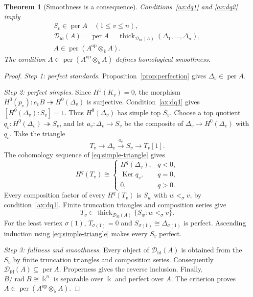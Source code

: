\documentclass[11pt,a4paper]{article}
\newcommand{\defn}[1]{\textsl{\color{darkblue} #1}}
\newcommand{\D}{\mathcal D}
\newcommand{\op}{\mathrm{op}}
\newcommand{\std}{\Delta}
\newcommand{\Ker}{\operatorname{Ker}}
\DeclareMathOperator{\fd}{fd}
\DeclareMathOperator{\thick}{thick}
\DeclareMathOperator{\per}{per}
\DeclareMathOperator{\rad}{rad}
\theoremstyle{plain}
\newtheorem{theorem}{Theorem}[section]
\theoremstyle{definition}
\numberwithin{equation}{section}
\begin{document}
\begin{theorem}[Smoothness is a consequence]\label{thm:smoothness}
Conditions~\ref{ax:dq1} and \ref{ax:dq2} imply
\begin{equation}\label{eq:smoothness}
 \begin{gathered}
 S_v\in\per A\quad(1\leq v\leq n),\\
 \D_{\fd}(A)=\per A
 =\thick_{\D_{\fd}(A)}(\std_1,\ldots,\std_n),\\
 A\in\per(A^{\op}\otimes_{\Bbbk}A).
 \end{gathered}
\end{equation}
The condition $A\in\per(A^{\op}\otimes_{\Bbbk}A)$ defines
\defn{homological smoothness}.
\end{theorem}
\begin{proof}
\noindent\textit{Step 1: perfect standards.}
Proposition~\ref{prop:perfection} gives $\std_v\in\per A$.

\noindent\textit{Step 2: perfect simples.}
Since $H^1(K_v)=0$, the morphism
$H^0(p_v):e_vB\twoheadrightarrow H^0(\std_v)$ is surjective.
Condition~\ref{ax:dq1} gives $[H^0(\std_v):S_v]=1$.
Thus $H^0(\std_v)$ has simple top $S_v$. Choose a top quotient
$q_v:H^0(\std_v)\twoheadrightarrow S_v$, and let
$a_v:\std_v\to S_v$ be the composite of
$\std_v\to H^0(\std_v)$ with $q_v$. Take the triangle
\begin{equation}\label{eq:simple-triangle}
 T_v\longrightarrow\std_v\xrightarrow{a_v}S_v
 \longrightarrow T_v[1].
\end{equation}
The cohomology sequence of \eqref{eq:simple-triangle} gives
\begin{equation}\label{eq:simple-fibre}
 H^q(T_v)\cong
 \begin{cases}
 H^q(\std_v),&q<0,\\
 \Ker q_v,&q=0,\\
 0,&q>0.
 \end{cases}
\end{equation}
Every composition factor of every $H^q(T_v)$ is $S_w$ with
$w<_\sigma v$, by condition~\ref{ax:dq1}. Finite truncation
triangles and composition series give
\begin{equation}\label{eq:simple-induction}
 T_v\in\thick_{\D_{\fd}(A)}\{S_w:w<_\sigma v\}.
\end{equation}
For the least vertex $\sigma(1)$, $T_{\sigma(1)}=0$ and
$S_{\sigma(1)}\cong\std_{\sigma(1)}$ is perfect. Ascending
induction using \eqref{eq:simple-triangle} makes every $S_v$ perfect.

\noindent\textit{Step 3: fullness and smoothness.}
Every object of $\D_{\fd}(A)$ is obtained from the $S_v$ by finite
truncation triangles and composition series. Consequently
$\D_{\fd}(A)\subseteq\per A$. Properness gives the reverse
inclusion. Finally, $B/\rad B\cong\Bbbk^n$ is separable over
$\Bbbk$ and perfect over $A$. The criterion
\cite[Theorem 5.8]{RS22} proves
$A\in\per(A^{\op}\otimes_{\Bbbk}A)$.
\end{proof}
\end{document}
